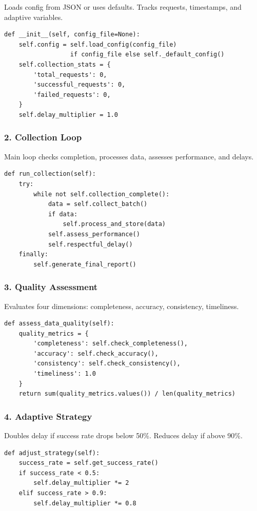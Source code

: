 \documentclass[12pt,a4paper]{article}
\begin{document}
Loads config from JSON or uses defaults. Tracks requests, timestamps, and adaptive variables.

\begin{verbatim}
def __init__(self, config_file=None):
    self.config = self.load_config(config_file)
                  if config_file else self._default_config()
    self.collection_stats = {
        'total_requests': 0,
        'successful_requests': 0,
        'failed_requests': 0,
    }
    self.delay_multiplier = 1.0
\end{verbatim}

\subsubsection{2. Collection Loop}

Main loop checks completion, processes data, assesses performance, and delays.

\begin{verbatim}
def run_collection(self):
    try:
        while not self.collection_complete():
            data = self.collect_batch()
            if data:
                self.process_and_store(data)
            self.assess_performance()
            self.respectful_delay()
    finally:
        self.generate_final_report()
\end{verbatim}

\subsubsection{3. Quality Assessment}

Evaluates four dimensions: completeness, accuracy, consistency, timeliness.

\begin{verbatim}
def assess_data_quality(self):
    quality_metrics = {
        'completeness': self.check_completeness(),
        'accuracy': self.check_accuracy(),
        'consistency': self.check_consistency(),
        'timeliness': 1.0
    }
    return sum(quality_metrics.values()) / len(quality_metrics)
\end{verbatim}

\subsubsection{4. Adaptive Strategy}

Doubles delay if success rate drops below 50\%. Reduces delay if above 90\%.

\begin{verbatim}
def adjust_strategy(self):
    success_rate = self.get_success_rate()
    if success_rate < 0.5:
        self.delay_multiplier *= 2
    elif success_rate > 0.9:
        self.delay_multiplier *= 0.8
\end{verbatim}
\end{document}

